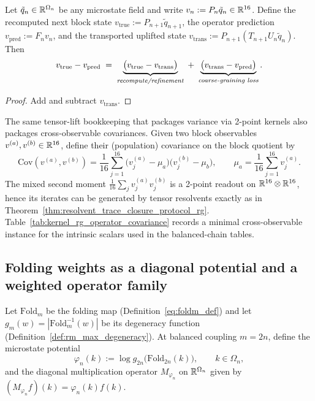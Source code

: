 \begin{lemma}\label{lem:rg_error_budget_decomposition}
\MathTag Let $\tilde q_n\in\mathbb{R}^{\Omega_n}$ be any microstate field and write $v_n:=P_n\tilde q_n\in\mathbb{R}^{16}$.
Define the recomputed next block state $v_{\mathrm{true}}:=P_{n+1}\tilde q_{n+1}$, the operator prediction $v_{\mathrm{pred}}:=F_n v_n$, and the transported uplifted state $v_{\mathrm{trans}}:=P_{n+1}(T_{n+1}U_n\tilde q_n)$.
Then
\[
v_{\mathrm{true}}-v_{\mathrm{pred}}
\;=\;
\underbrace{\bigl(v_{\mathrm{true}}-v_{\mathrm{trans}}\bigr)}_{\text{\emph{recompute/refinement}}}
\;+\;
\underbrace{\bigl(v_{\mathrm{trans}}-v_{\mathrm{pred}}\bigr)}_{\text{\emph{coarse-graining loss}}}.
\]
\end{lemma}
\begin{proof}
Add and subtract $v_{\mathrm{trans}}$.
\end{proof}

\begin{remark}\label{rem:rg_two_point_library}
\AuditTag The same tensor-lift bookkeeping that packages variance via 2-point kernels also packages cross-observable covariances.
Given two block observables $v^{(a)},v^{(b)}\in\mathbb{R}^{16}$, define their (population) covariance on the block quotient by
\[
\mathrm{Cov}(v^{(a)},v^{(b)})=\frac{1}{16}\sum_{j=1}^{16}\bigl(v^{(a)}_j-\mu_a\bigr)\bigl(v^{(b)}_j-\mu_b\bigr),
\qquad
\mu_a=\frac{1}{16}\sum_{j=1}^{16}v^{(a)}_j.
\]
The mixed second moment $\frac{1}{16}\sum_j v^{(a)}_j v^{(b)}_j$ is a 2-point readout on $\mathbb{R}^{16}\otimes\mathbb{R}^{16}$, hence its iterates can be generated by tensor resolvents exactly as in Theorem~\ref{thm:resolvent_trace_closure_protocol_rg}.
Table~\ref{tab:kernel_rg_operator_covariance} records a minimal cross-observable instance for the intrinsic scalars used in the balanced-chain tables.
\end{remark}

\subsection{Folding weights as a diagonal potential and a weighted operator family}
\label{subsec:rg_operator_weighted}

\begin{definition}\label{def:folding_potential_microstates}
\MathTag Let $\mathrm{Fold}_m$ be the folding map (Definition~\eqref{eq:foldm_def}) and let $g_m(w)=|\mathrm{Fold}_m^{-1}(w)|$ be its degeneracy function (Definition~\ref{def:rm_max_degeneracy}).
At balanced coupling $m=2n$, define the microstate potential
\[
\varphi_n(k):=\log g_{2n}\!\bigl(\mathrm{Fold}_{2n}(k)\bigr),
\qquad k\in\Omega_n,
\]
and the diagonal multiplication operator $M_{\varphi_n}$ on $\mathbb{R}^{\Omega_n}$ given by $(M_{\varphi_n}f)(k)=\varphi_n(k)f(k)$.
\end{definition}

